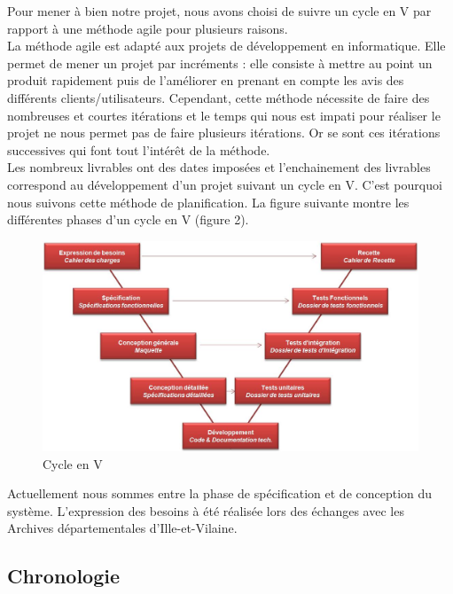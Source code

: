 \documentclass[a4paper]{article}
\begin{document}
	Pour mener à bien notre projet, nous avons choisi de suivre un cycle en V par rapport à une méthode agile pour plusieurs raisons.\\
	
	La méthode agile est adapté aux projets de développement en informatique. Elle permet de mener un projet par incréments : elle consiste à mettre au point un produit rapidement puis de l'améliorer en prenant en compte les avis des différents clients/utilisateurs. Cependant, cette méthode nécessite de faire des nombreuses et courtes itérations et le temps qui nous est impati pour réaliser le projet ne nous permet pas de faire plusieurs itérations. Or se sont ces itérations successives qui font tout l'intérêt de la méthode.\\
	
	Les nombreux livrables ont des dates imposées et l'enchainement des livrables correspond au développement d'un projet suivant un cycle en V. C'est pourquoi nous suivons cette méthode de planification. La figure suivante montre les différentes phases d'un cycle en V (figure 2).\\
	
\begin{figure}[H]
\centering
\includegraphics[width=\textwidth]{Cycle_en_V.jpg}
\caption{Cycle en V}
\label{fig:cycleenv}
\end{figure}
	
	Actuellement nous sommes entre la phase de spécification et de conception du système. L'expression des besoins à été réalisée lors des échanges avec les Archives départementales d’Ille-et-Vilaine.
	
\subsection{Chronologie}
\end{document}
